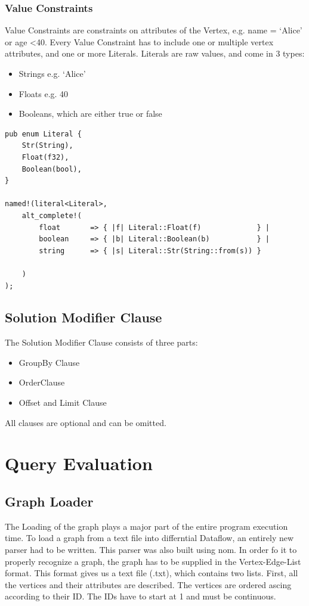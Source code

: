 \documentclass[11pt,singlecolumn]{scrartcl}
\begin{document}
 \subsubsection{Value Constraints}
 Value Constraints are constraints on attributes of the Vertex, e.g. name = `Alice' or age \textless  40. Every Value Constraint has to include one or multiple vertex attributes, and one or more Literals. Literals are raw values, and come in 3 types:
 \begin{itemize} 
\item Strings e.g. `Alice'
\item Floats e.g. 40
\item Booleans, which are either true or false
\end{itemize}
 
 \begin{lstlisting}
pub enum Literal {
    Str(String),
    Float(f32),
    Boolean(bool),
} 
 
named!(literal<Literal>,
    alt_complete!(
        float       => { |f| Literal::Float(f)             } |
        boolean     => { |b| Literal::Boolean(b)           } |
        string      => { |s| Literal::Str(String::from(s)) } 
            
    )
);
 \end{lstlisting}
 
 \clearpage
 
 \subsection{Solution Modifier Clause}
 
 The Solution Modifier Clause consists of three parts: 
  \begin{itemize} 
\item GroupBy Clause
\item OrderClause
\item Offset and Limit Clause
\end{itemize}
 All clauses are optional and can be omitted. 
 
\clearpage



\section{Query Evaluation}

\subsection{Graph Loader}
The Loading of the graph plays a major part of the entire program execution time. To load a graph from a text file into differntial Dataflow, an entirely new parser had to be written. This parser was also built using nom. In order fo it to properly recognize a graph, the graph has to be supplied in the Vertex-Edge-List format. This format gives us a text file (.txt), which contains two lists. First, all the vertices and their attributes are described. The vertices are ordered ascing according to their ID. The IDs have to start at 1 and must be continuous.
\end{document}
